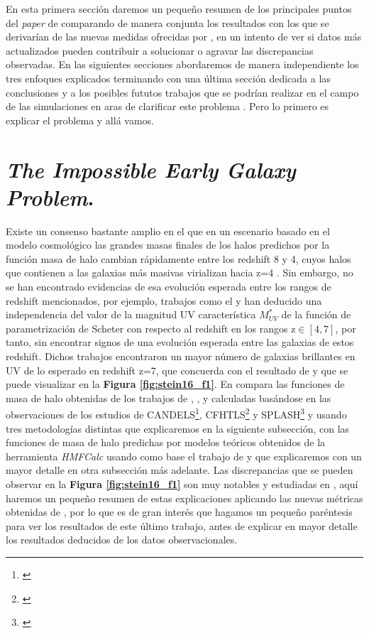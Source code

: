 En esta primera sección daremos un pequeño resumen de los principales puntos del \textit{paper} de \cite{steinhardt2016impossibly} comparando de manera conjunta los resultados con los que se derivarían de las nuevas medidas ofrecidas por \cite{behroozi2019universemachine}, en un intento de ver si datos más actualizados pueden contribuir a solucionar o agravar las discrepancias observadas. En las siguientes secciones abordaremos de manera independiente los tres enfoques explicados terminando con una última sección dedicada a las conclusiones y a los posibles fututos trabajos que se podrían realizar en el campo de las simulaciones en aras de clarificar este problema . Pero lo primero es explicar el problema y allá vamos.


\section{\textit{The Impossible Early Galaxy Problem}.}

Existe un consenso bastante amplio en el que en un escenario basado en el modelo cosmológico \lcdm las grandes masas finales de los halos predichos por la función masa de halo cambian rápidamente entre los redshift 8 y 4, cuyos halos que contienen a las galaxias más masivas virializan hacia z=4 \citep{steinhardt2016impossibly}. Sin embargo, no se han encontrado evidencias de esa evolución esperada entre los rangos de redshift mencionados, por ejemplo, trabajos como el \cite{finkelstein2015increasing} y \cite{finkelstein2015evolution} han deducido una independencia del valor de la magnitud UV característica $M^*_{UV}$ de la función de  parametrización de Scheter con respecto al redshift en los rangos z$\in [4,7]$, por tanto, sin encontrar signos de una evolución esperada entre las galaxias de estos redshift. Dichos trabajos encontraron un mayor número de galaxias brillantes en UV de lo esperado en redshift z=7, que concuerda con el resultado de \cite{steinhardt2016impossibly} y que se puede visualizar en la \textbf{Figura \ref{fig:stein16_f1}}. En \cite{steinhardt2016impossibly} compara las funciones de masa de halo obtenidas de los trabajos de \cite{hildebrandt2009cars}, \cite{steinhardt2014uniform}, \cite{bouwens2015reionization} y \cite{bouwens2015uv} calculadas basándose en las observaciones de los estudios de CANDELS\footnote{\cite{grogin2011candels}}, CFHTLS\footnote{\cite{hildebrandt2009cars}} y SPLASH\footnote{\cite{capak2012splash}} y usando tres metodologías distintas que explicaremos en la siguiente subsección, con las funciones de masa de halo predichas por modelos teóricos obtenidos de la herramienta \textit{HMFCalc} \citep{murray2013hmfcalc} usando como base el trabajo de \cite{sheth2001ellipsoidal} y que explicaremos con un mayor detalle en otra subsección más adelante. Las discrepancias que se pueden observar en la \textbf{Figura \ref{fig:stein16_f1}} son muy notables y estudiadas en \cite{steinhardt2016impossibly}, aquí haremos un pequeño resumen de estas explicaciones aplicando las nuevas métricas obtenidas de \cite{behroozi2019universemachine}, por lo que es de gran interés que hagamos un pequeño paréntesis para ver los resultados de este último trabajo, antes de explicar en mayor detalle los resultados deducidos de los datos observacionales.

